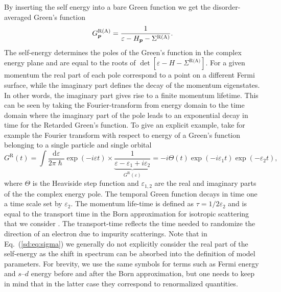 By inserting the self energy into a bare Green function we get the disorder-averaged Green's function
\begin{equation}
	G^\text{R(A)}_{\boldsymbol{p}} = \frac{1}{\varepsilon-H_{\boldsymbol{p}}-\Sigma^\text{R(A)}}.
\end{equation}
The self-energy determines the poles of the Green's function in the complex energy plane and are equal to the roots of $\det[\varepsilon-H-\Sigma^\text{R(A)}]$. For a given momentum the real part of each pole correspond to a point on a different Fermi surface, while the imaginary part defines the decay of the momentum eigenstates. In other words, the imaginary part gives rise to a finite momentum lifetime. This can be seen by taking the Fourier-transform from energy domain to the time domain where the imaginary part of the pole leads to an exponential decay in time for the Retarded Green's function. To give an explicit example, take for example the Fourier transform with respect to energy of a Green's function belonging to a single particle and single orbital 
\begin{equation}
	G^\text{R}(t) = \int\!\frac{\mathrm{d}\varepsilon}{2\pi\hslash} \exp(-i \varepsilon t)\times\underbrace{\frac{1}{\varepsilon-\varepsilon_1+i\varepsilon_2}}_{G^\text{R}(\varepsilon)} = -i\Theta(t)\exp(-i\varepsilon_1t)\exp(-\varepsilon_2 t), 
\end{equation}
where $\Theta$ is the Heaviside step function and $\varepsilon_{1,2}$ are the real and imaginary parts of the the complex energy pole. The temporal Green function decays in time one a time scale set by $\varepsilon_2$. The momentum life-time is defined as $\tau = 1/2\varepsilon_2$ and is equal to the transport time in the Born approximation for isotropic scattering that we consider \cite{rammer_quantum_1986}. The transport-time reflects the time needed to randomize the direction of an electron due to impurity scatterings. Note that in Eq.~(\ref{sd:eq:sigma}) we generally do not explicitly consider the real part of the self-energy as the shift in spectrum can be absorbed into the definition of model parameters. For brevity, we use the same symbols for terms such as Fermi energy and $s$--$d$ energy before and after the Born approximation, but one needs to keep in mind that in the latter case they correspond to renormalized quantities. 

